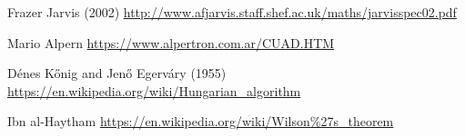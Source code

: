 %
%

%
% 
% 
%
\begin{thebibliography}{99.}

 Frazer Jarvis (2002)
\href{http://www.afjarvis.staff.shef.ac.uk/maths/jarvisspec02.pdf}{http://www.afjarvis.staff.shef.ac.uk/maths/jarvisspec02.pdf}

 Mario Alpern
\href{https://www.alpertron.com.ar/CUAD.HTM}{https://www.alpertron.com.ar/CUAD.HTM}

 Dénes Kőnig and Jenő Egerváry (1955)
\href{https://en.wikipedia.org/wiki/Hungarian\_algorithm}{https://en.wikipedia.org/wiki/Hungarian\_algorithm}

 Ibn al-Haytham
\href{https://en.wikipedia.org/wiki/Wilson\%27s\_theorem}{https://en.wikipedia.org/wiki/Wilson\%27s\_theorem}


\end{thebibliography}

